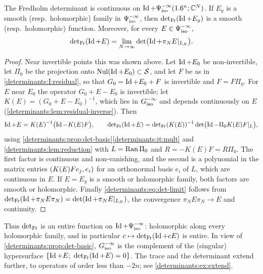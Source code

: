 \begin{theorem}\label{determinants:thm:det-entire}
  The Fredholm determinant is continuous on $\operatorname{Id}+\Psi^{-\infty}_{\mathrm{iso}}(1.6^n;\mathbb{C}^N)$.
  If $E_y$ is a smooth (resp.\ holomorphic) family in $\Psi^{-\infty}_{\mathrm{iso}}$, then
  $\operatorname{det}_{\mathrm{Fr}}(\operatorname{Id}+E_y)$ is a smooth (resp.\ holomorphic) function. Moreover, for
  every $E\in\Psi^{-\infty}_{\mathrm{iso}}$,
  \begin{equation}\label{determinants:eq:det-limit}
    \operatorname{det}_{\mathrm{Fr}}(\operatorname{Id}+E)=\lim_{N\to\infty}\det\bigl(\operatorname{Id}+\pi_NE|_{L_N}\bigr).
  \end{equation}
\end{theorem}
\begin{proof}
  Near invertible points this was shown above. Let $\operatorname{Id}+E_0$ be
  non-invertible, let $\Pi_0$ be the projection onto $\operatorname{Nul}(\operatorname{Id}+E_0)\subset\mathcal{S}$,
  and let $F$ be as in \ref{determinants:I:residual}, so that
  $G_0=\operatorname{Id}+E_0+F$ is invertible and $F=F\Pi_0$. For $E$ near $E_0$ the operator
  $G_0+E-E_0$ is invertible; let $K(E)=(G_0+E-E_0)^{-1}$, which lies in
  $G^{-\infty}_{\mathrm{iso}}$ and depends continuously on $E$
  (\cref{determinants:lem:residual-inverse}). Then
  \begin{equation*}
    \operatorname{Id}+E=K(E)^{-1}\bigl(\operatorname{Id}-K(E)F\bigr),\qquad
    \operatorname{det}_{\mathrm{Fr}}(\operatorname{Id}+E)=\operatorname{det}_{\mathrm{Fr}}(K(E))^{-1}\det\bigl(\operatorname{Id}-\Pi_0K(E)F|_{L}\bigr),
  \end{equation*}
  using \cref{determinants:prop:det-basic}\ref{determinants:it:mult} and
  \cref{determinants:lem:reduction} with $L=\operatorname{Ran}\Pi_0$ and $R=-K(E)F=R\Pi_0$.
  The first factor is continuous and non-vanishing, and the second is a
  polynomial in the matrix entries $( K(E)Fe_j, e_i)$ for an orthonormal
  basis $e_i$ of $L$, which are continuous in $E$. If $E=E_y$ is a smooth or
  holomorphic family, both factors are smooth or holomorphic. Finally
  \eqref{determinants:eq:det-limit} follows from
  $\operatorname{det}_{\mathrm{Fr}}(\operatorname{Id}+\pi_NE\pi_N)=\det(\operatorname{Id}+\pi_NE|_{L_N})$, the convergence
  $\pi_NE\pi_N\to E$ and continuity.
\end{proof}

\begin{remark}\label{determinants:rem:det-entire}
  Thus $\operatorname{det}_{\mathrm{Fr}}$ is an entire function on $\operatorname{Id}+\Psi^{-\infty}_{\mathrm{iso}}$: holomorphic
  along every holomorphic family, and in particular $c\mapsto\operatorname{det}_{\mathrm{Fr}}(\operatorname{Id}+cE)$
  is entire. In view of \cref{determinants:prop:det-basic}, $G^{-\infty}_{\mathrm{iso}}$
  is the complement of the (singular) hypersurface
  $\{\Id+E;\ \detFr(\Id+E)=0\}$. The trace and the determinant extend further,
  to operators of order less than $-2n$; see \cref{determinants:ex:extend}.
\end{remark}

